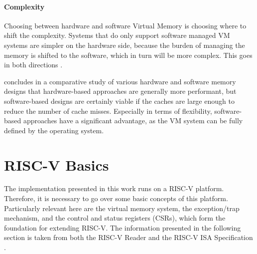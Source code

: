 \paragraph{Complexity} Choosing between hardware and software Virtual Memory is choosing where to shift the complexity.
Systems that do only support software managed VM systems are simpler on the hardware side, because the burden of managing the memory is shifted to the software, which in turn will be more complex.
This goes in both directions \cite{jacob1998virtualissues}.

\cite{jacob1998look} concludes in a comparative study of various hardware and software memory designs
that hardware-based approaches are generally more performant, but software-based designs are certainly
viable if the caches are large enough to reduce the number of cache misses.
Especially in terms of flexibility, software-based approaches have a significant advantage,
as the VM system can be fully defined by the operating system.








\section{RISC-V Basics}
The implementation presented in this work runs on a RISC-V platform. Therefore, it is necessary
to go over some basic concepts of this platform. Particularly relevant here are the virtual
memory system, the exception/trap mechanism, and the control and status registers (CSRs), which
form the foundation for extending RISC-V.
The information presented in the following section is taken from both the RISC-V Reader \cite{riscvreader} and the RISC-V ISA Specification \cite{RISCVInstructionSet}.

